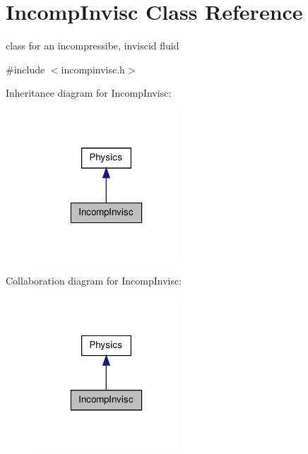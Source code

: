 \hypertarget{classIncompInvisc}{\section{\-Incomp\-Invisc \-Class \-Reference}
\label{classIncompInvisc}
}


class for an incompressibe, inviscid fluid  




{\ttfamily \#include $<$incompinvisc.\-h$>$}



\-Inheritance diagram for \-Incomp\-Invisc\-:\nopagebreak
\begin{figure}[H]
\begin{center}
\leavevmode
\includegraphics[width=154pt]{classIncompInvisc__inherit__graph}
\end{center}
\end{figure}


\-Collaboration diagram for \-Incomp\-Invisc\-:\nopagebreak
\begin{figure}[H]
\begin{center}
\leavevmode
\includegraphics[width=154pt]{classIncompInvisc__coll__graph}
\end{center}
\end{figure}

